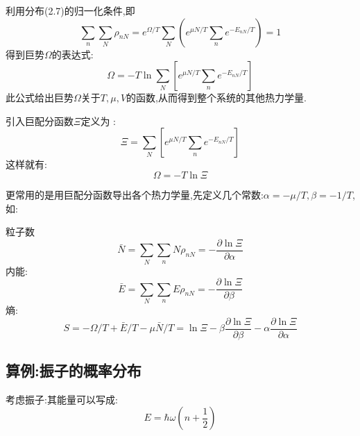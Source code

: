 利用分布(2.7)的归一化条件,即 
\[\sum_n\sum_N \rho_{nN}=e^{\Omega / T}\sum_N\left( e^{\mu N / T} \sum_n e^{-E_{nN} / T} \right) =1 \]
得到巨势$\Omega$的表达式:
\begin{equation}
  \Omega= -T \ln\sum_N\left[ e^{\mu N / T}\sum_ne^{-E_{nN} / T} \right] 
\end{equation}
此公式给出巨势$\Omega$关于$T,\mu , V$的函数,从而得到整个系统的其他热力学量.

引入巨配分函数$\Xi$定义为 :
\begin{equation}
  \Xi=\sum_N\left[ e^{\mu N / T}\sum_ne^{-E_{nN} / T} \right]
\end{equation}
这样就有:
\begin{equation}
  \Omega=-T\ln\Xi
\end{equation}


更常用的是用巨配分函数导出各个热力学量,先定义几个常数:$\alpha=-\mu /T,\beta=-1/T$,如:

粒子数\[\bar{N}=\sum_N \sum _nN\rho_{nN}=-\dfrac{\partial \ln \Xi}{\partial \alpha}\]
内能:\[\bar{E}=\sum_N \sum_n E \rho_{nN}=-\dfrac{\partial \ln \Xi}{\partial \beta}\]
熵:\[S = -\Omega/T+\bar{E}/T -\mu \bar{N} /T=\ln \Xi-\beta\dfrac{\partial \ln\Xi}{\partial \beta}-\alpha\dfrac{\partial \ln\Xi}{\partial \alpha}\]


\subsection{算例:振子的概率分布}
  考虑振子:其能量可以写成:
  \begin{equation}
    E= \hbar \omega (n+\frac{1}{2})
  \end{equation}
  